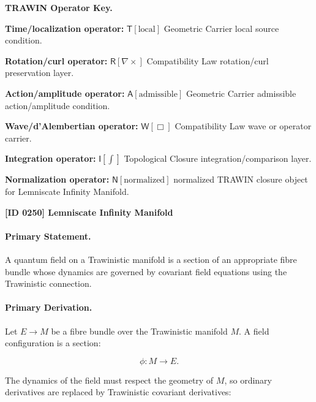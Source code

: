\par\vspace{0.45\baselineskip}
\noindent\begin{minipage}[t]{\linewidth}
\begingroup
\small
\raggedright
\textbf{TRAWIN Operator Key.}\par
\noindent\textbf{Time/localization operator:} $\mathsf{T}\!\left[\mathrm{local}\right]$ Geometric Carrier local source condition.\par
\noindent\textbf{Rotation/curl operator:} $\mathsf{R}\!\left[\nabla\times\right]$ Compatibility Law rotation/curl preservation layer.\par
\noindent\textbf{Action/amplitude operator:} $\mathsf{A}\!\left[\mathrm{admissible}\right]$ Geometric Carrier admissible action/amplitude condition.\par
\noindent\textbf{Wave/d'Alembertian operator:} $\mathsf{W}\!\left[\Box\right]$ Compatibility Law wave or operator carrier.\par
\noindent\textbf{Integration operator:} $\mathsf{I}\!\left[\int\right]$ Topological Closure integration/comparison layer.\par
\noindent\textbf{Normalization operator:} $\mathsf{N}\!\left[\mathrm{normalized}\right]$ normalized TRAWIN closure object for Lemniscate Infinity Manifold.\par
\endgroup
\end{minipage}

\clearpage
\noindent\textbf{[ID 0250] Lemniscate Infinity Manifold}\par
\vspace{0.35em}
\paragraph{Primary Statement.}
A quantum field on a Trawinistic manifold is a section of an appropriate fibre bundle whose dynamics are governed by covariant field equations using the Trawinistic connection.

\paragraph{Primary Derivation.}
Let $E\to M$ be a fibre bundle over the Trawinistic manifold $M$.  
A field configuration is a section:

\begin{equation}
\phi:M\to E .
\end{equation}

The dynamics of the field must respect the geometry of $M$, so ordinary derivatives are replaced by Trawinistic covariant derivatives:


